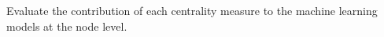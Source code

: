 \documentclass[preview]{standalone}
\begin{document}
Evaluate the contribution of each centrality measure to the machine learning models at the node level.\\
\end{document}
